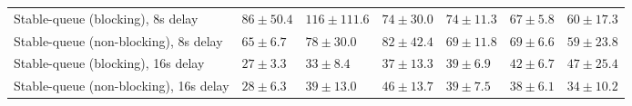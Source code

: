 \begin{table}[H]
{\begin{tabular}{l w{c}{5.0em} w{c}{5.0em} w{c}{5.0em} w{c}{5.0em} w{c}{5.0em} w{c}{5.0em}}
Stable-queue (blocking), 8s delay & $86\pm50.4$ & $116\pm111.6$ & $74\pm30.0$ & $74\pm11.3$ & $67\pm5.8$ & $60\pm17.3$ \\
Stable-queue (non-blocking), 8s delay & $65\pm6.7$ & $78\pm30.0$ & $82\pm42.4$ & $69\pm11.8$ & $69\pm6.6$ & $59\pm23.8$ \\
Stable-queue (blocking), 16s delay & $27\pm3.3$ & $33\pm8.4$ & $37\pm13.3$ & $39\pm6.9$ & $42\pm6.7$ & $47\pm25.4$ \\
Stable-queue (non-blocking), 16s delay & $28\pm6.3$ & $39\pm13.0$ & $46\pm13.7$ & $39\pm7.5$ & $38\pm6.1$ & $34\pm10.2$ \\
\bottomrule
\end{tabular}%
}
\end{table}
